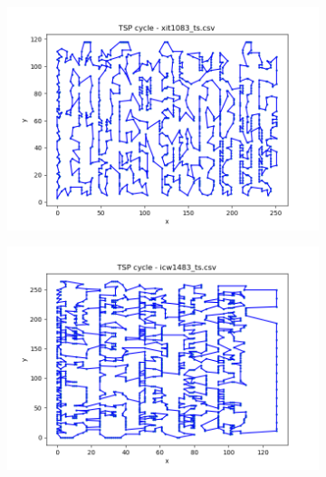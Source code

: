 \documentclass[12pt]{article}
\begin{document}
        \begin{figure}[htpb]
            \begin{subfigure}[b]{0.475\textwidth}
                \includegraphics[width=\linewidth]{img/xit1083_ts.png}
            \end{subfigure}
            \hfill
            \begin{subfigure}[b]{0.475\textwidth}
                \includegraphics[width=\linewidth]{img/icw1483_ts.png}
            \end{subfigure}
            \begin{subfigure}[b]{0.475\textwidth}

\end{subfigure}
\end{figure}
\end{document}
